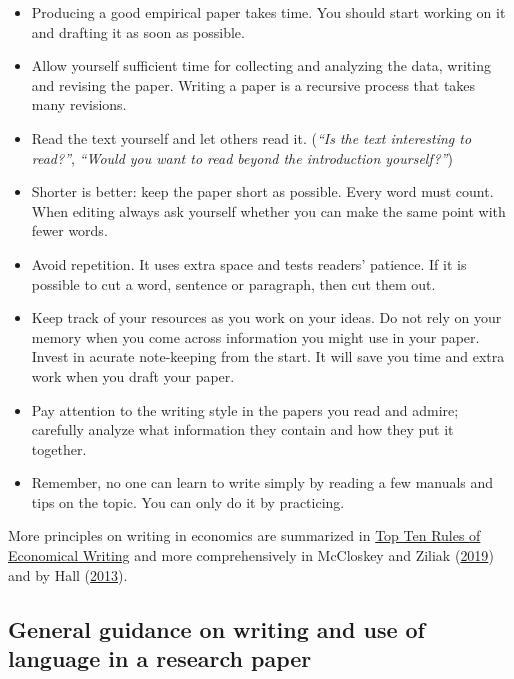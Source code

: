 \documentclass[
]{book}
\providecommand{\tightlist}{%
  \setlength{\itemsep}{0pt}\setlength{\parskip}{0pt}}
\begin{document}
\begin{itemize}
\tightlist
\item
  Producing a good empirical paper takes time. You should start working
  on it and drafting it as soon as possible.
\item
  Allow yourself sufficient time for collecting and analyzing the data,
  writing and revising the paper. Writing a paper is a recursive process
  that takes many revisions.
\item
  Read the text yourself and let others read it. (\emph{``Is the text
  interesting to read?''}, \emph{``Would you want to read beyond the
  introduction yourself?''})
\item
  Shorter is better: keep the paper short as possible. Every word must
  count. When editing always ask yourself whether you can make the same
  point with fewer words.
\item
  Avoid repetition. It uses extra space and tests readers' patience. If
  it is possible to cut a word, sentence or paragraph, then cut them
  out.
\item
  Keep track of your resources as you work on your ideas. Do not rely on
  your memory when you come across information you might use in your
  paper. Invest in acurate note-keeping from the start. It will save you
  time and extra work when you draft your paper.
\item
  Pay attention to the writing style in the papers you read and admire;
  carefully analyze what information they contain and how they put it
  together.
\item
  Remember, no one can learn to write simply by reading a few manuals
  and tips on the topic. You can only do it by practicing.
\end{itemize}

More principles on writing in economics are summarized in
\href{http://www3.nccu.edu.tw/~jthuang/rules.html}{Top Ten Rules of
Economical Writing} and more comprehensively in McCloskey and Ziliak
(\protect\hyperlink{ref-mccloskey_economical_2019}{2019}) and by Hall
(\protect\hyperlink{ref-hall_how_2013}{2013}).

\hypertarget{general-guidance-on-writing-and-use-of-language-in-a-research-paper}{%
\subsection{General guidance on writing and use of language in a
research
paper}\label{general-guidance-on-writing-and-use-of-language-in-a-research-paper}}
\end{document}
